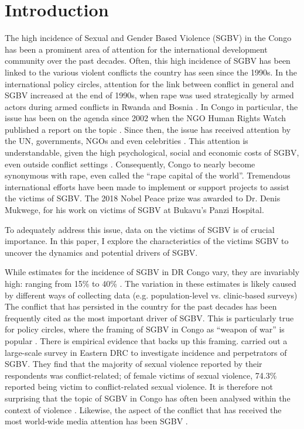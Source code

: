 \documentclass[10pt,a4paper]{scrartcl} %
\begin{document}
\section*{Introduction}
The high incidence of Sexual and Gender Based Violence (SGBV) in the Congo has been a prominent area of attention for the international development community over the past decades. Often, this high incidence of SGBV has been linked to the various violent conflicts the country has seen since the 1990s. In the international policy circles, attention for the link between conflict in general and SGBV increased at the end of 1990s, when rape was used strategically by armed actors during armed conflicts in Rwanda and Bosnia  \citep{Kirby2015}. In Congo in particular, the issue has been on the agenda since 2002 when the NGO Human Rights Watch published a report on the topic \citep{HRW2002}. Since then, the issue has received attention by the UN, governments, NGOs and even celebrities \citep{Baaz2013}. This attention is understandable, given the high psychological, social and economic costs of SGBV, even outside conflict settings \citep{Post2002,Peterson2018}. Consequently, Congo to nearly become synonymous with rape, even called the ``rape capital of the world''. Tremendous international efforts have been made to implement or support projects to assist the victims of SGBV. The 2018 Nobel Peace prize was awarded to Dr. Denis Mukwege, for his work on victims of SGBV at Bukavu's Panzi Hospital.
 
To adequately address this issue, data on the victims of SGBV is of crucial importance. In this paper, I explore the characteristics of the victims SGBV to uncover the dynamics and potential drivers of SGBV.

While estimates for the incidence of SGBV in DR Congo vary, they are invariably high: ranging from 15\% to 40\% \citep{Johnson2010,Peterman2011}. The variation in these estimates is likely caused by different ways of collecting data (e.g. population-level vs. clinic-based surveys) The conflict that has persisted in the country for the past decades has been frequently cited as the most important driver of SGBV. This is particularly true for policy circles, where the framing of SGBV in Congo as ``weapon of war'' is popular \citep{Baaz2013,Kirby2015}. There is empirical evidence that backs up this framing. \cite{Johnson2010} carried out a large-scale survey in Eastern DRC to investigate incidence and perpetrators of SGBV. They find that the majority of sexual violence reported by their respondents was conflict-related; of female victims of sexual violence, 74.3\% reported being victim to conflict-related sexual violence. It is therefore not surprising that the topic of SGBV in Congo has often been analysed within the context of violence \citep{Baaz2013}. Likewise, the aspect of the conflict that has received the most world-wide media attention has been SGBV \citep{Autesserre2012a}.  
\end{document}
